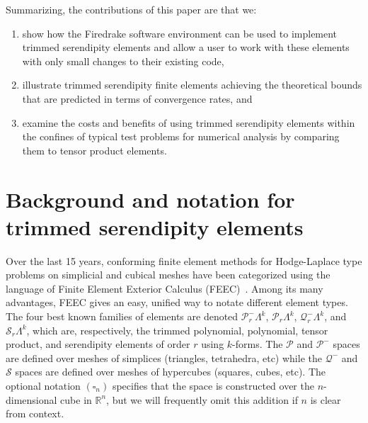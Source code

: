 \documentclass[format=acmsmall,screen,timestamp=false,a4paper]{acmart}
\newcommand{\R}{\mathbb{R}}
\newcommand{\calP}{\mathcal{P}}
\newcommand{\calQ}{\mathcal{Q}}
\newcommand{\calS}{\mathcal{S}}
\begin{document}
Summarizing, the contributions of this paper are that we:
\begin{enumerate}
\item show how the Firedrake software environment can be used to implement trimmed serendipity elements and allow a user to work with these elements with only small changes to their existing code, 
\item illustrate trimmed serendipity finite elements achieving the theoretical bounds that are predicted in terms of convergence rates, and  
\item examine the costs and benefits of using trimmed serendipity elements within the confines of typical test problems for numerical analysis by comparing them to tensor product elements.
\end{enumerate}
  
  
  
\section{Background and notation for trimmed serendipity elements}
   
    Over the last 15 years, conforming finite element methods for Hodge-Laplace type problems on simplicial and cubical meshes have been categorized using the language of Finite Element Exterior Calculus (FEEC)~\cite{AFW2006,AFW2010,ABB2012}.  Among its many advantages, FEEC gives an easy, unified way to notate different element types.  The four best known families of elements are denoted $\calP^-_r \Lambda^k$, $\calP_r \Lambda^k$, $\calQ^-_r \Lambda^k$, and $\calS_r \Lambda^k$, which are, respectively, the trimmed polynomial, polynomial, tensor product, and serendipity elements of order $r$ using $k$-forms.  The $\calP$ and $\calP^-$ spaces are defined over meshes of simplices (triangles, tetrahedra, etc) while the $\calQ^-$ and $\calS$ spaces are defined over meshes of hypercubes (squares, cubes, etc). The optional notation $(\square_n)$ specifies that the space is constructed over the $n$-dimensional cube in $\R^n$, but we will frequently omit this addition if $n$ is clear from context.
    
\end{document}
